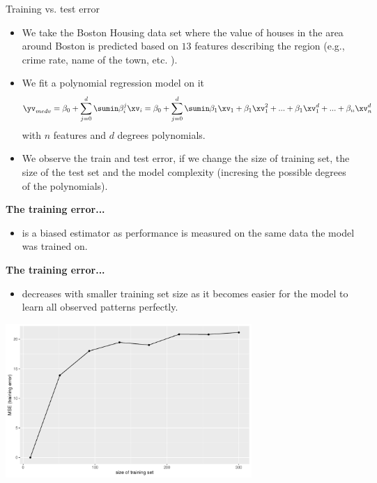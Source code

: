 \documentclass[11pt,compress,t,notes=noshow, xcolor=table]{beamer}
\begin{document}

\begin{vbframe}{Training vs. test error}
\begin{small}
\begin{itemize}
\item We take the Boston Housing data set where the value of houses in the area around Boston is predicted based on $13$ features describing the region (e.g., crime rate, name of the town, etc. ).
\item We fit a polynomial regression model on it $$ \yv_{medv} = \beta_0 + \sum_{j=0}^d \sumin \beta_{i}^j \xv_i= \beta_0 + \sum_{j=0}^d \sumin \beta_{1} \xv_{1} + \beta_{1}\xv_{1}^2+ ... + \beta_{1}\xv_{1}^d +  ... + \beta_{n} \xv_{n}^d$$
with $n$ features and $d$ degrees polynomials.
\item We observe the train and test error, if we change the size of training set, the size of the test set and the model complexity (incresing the possible degrees of the polynomials). 
\end{itemize}

\vfill

\textbf{The training error...}

\begin{itemize}
  \item is a biased estimator as performance is measured on the same data the 
  model was trained on.
\end{itemize}

\framebreak

\textbf{The training error...}
\begin{itemize}
  \item decreases with smaller training set size as it becomes easier for the 
  model to learn all observed patterns perfectly.
\end{itemize}
\end{small}
\begin{center}
\includegraphics[width=0.7\textwidth]{figure/fig-train-vs-test-error-1}
\end{center}


\end{vbframe}
\end{document}
